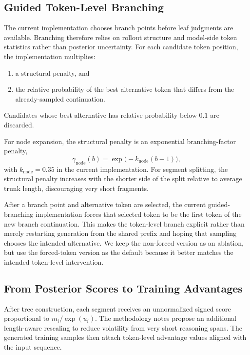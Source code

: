 \documentclass{article}
\begin{document}
\subsection{Guided Token-Level Branching}
The current implementation chooses branch points before leaf judgments are available. Branching therefore relies on rollout structure and model-side token statistics rather than posterior uncertainty. For each candidate token position, the implementation multiplies:
\begin{enumerate}
    \item a structural penalty, and
    \item the relative probability of the best alternative token that differs from the already-sampled continuation.
\end{enumerate}
Candidates whose best alternative has relative probability below $0.1$ are discarded.

For node expansion, the structural penalty is an exponential branching-factor penalty,
\begin{equation}
\gamma_{\text{node}}(b) = \exp\big(-k_{\text{node}}(b-1)\big),
\end{equation}
with $k_{\text{node}}=0.35$ in the current implementation.
For segment splitting, the structural penalty increases with the shorter side of the split relative to average trunk length, discouraging very short fragments.

After a branch point and alternative token are selected, the current guided-branching implementation forces that selected token to be the first token of the new branch continuation. This makes the token-level branch explicit rather than merely restarting generation from the shared prefix and hoping that sampling chooses the intended alternative. We keep the non-forced version as an ablation, but use the forced-token version as the default because it better matches the intended token-level intervention.

\subsection{From Posterior Scores to Training Advantages}
After tree construction, each segment receives an unnormalized signed score proportional to $m_i / \exp(u_i)$. The methodology notes propose an additional length-aware rescaling to reduce volatility from very short reasoning spans. The generated training samples then attach token-level advantage values aligned with the input sequence.
\end{document}
